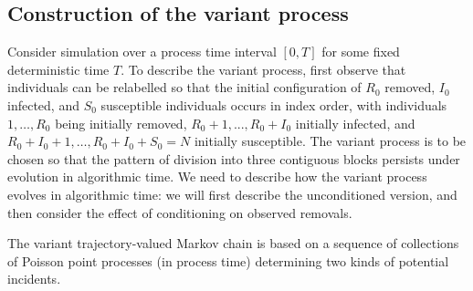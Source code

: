 \documentclass[]{article}
\newcommand{\Population}{N}
\begin{document}
\subsection{Construction of the variant process}\label{ssec:variant}
Consider simulation over a process time interval \([0,T]\) 
for some fixed deterministic time \(T\).
To describe the variant process, first
observe that
individuals 
can be relabelled 
so that the initial configuration of \(R_0\) removed, \(I_0\) infected, and \(S_0\) susceptible individuals occurs in index order, 
with individuals \(1, \ldots, R_0\) being initially removed,
\(R_0+1, ..., R_0+I_0\) initially infected,
and \(R_0+I_0+1, \ldots, R_0+I_0+S_0=\Population\) initially susceptible.
The variant process is to be chosen so that 
the pattern of division
into three contiguous blocks
persists under evolution in algorithmic time.
We need to describe how the variant process evolves in algorithmic time: 
we will first describe the unconditioned version,
and then consider the effect of conditioning on observed removals.

The variant trajectory-valued Markov chain 
is based on a sequence
of collections of
Poisson point processes (in process time)
determining two kinds of potential incidents.
\end{document}

